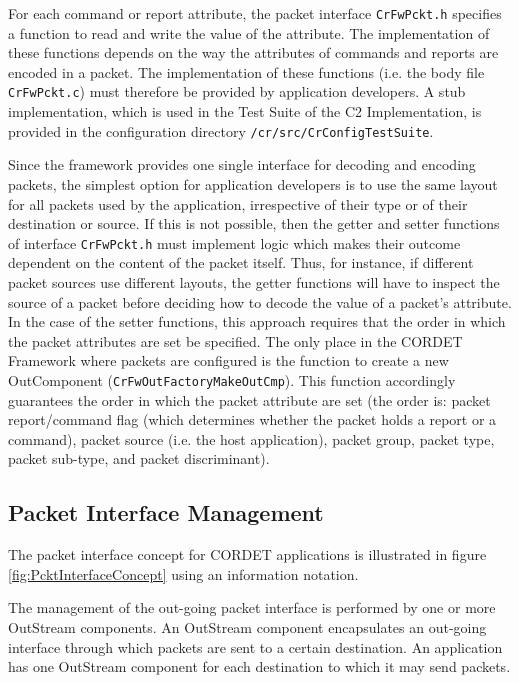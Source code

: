 \documentclass[a4paper,10pt]{article}
\begin{document}
For each command or report attribute, the packet interface \texttt{CrFwPckt.h} specifies a function to read and write the value of the attribute. The implementation of these functions depends on the way the attributes of commands and reports are encoded in a packet. The implementation of these functions (i.e. the body file \texttt{CrFwPckt.c}) must therefore be provided by application developers. A stub implementation, which is used in the Test Suite of the C2 Implementation, is provided in the configuration directory \texttt{/cr/src/CrConfigTestSuite}.

Since the framework provides one single interface for decoding and encoding packets, the simplest option for application developers is to use the same layout for all packets used by the application, irrespective of their type or of their destination or source. If this is not possible, then the getter and setter functions of interface \texttt{CrFwPckt.h} must implement logic which makes their outcome dependent on the content of the packet itself. Thus, for instance, if different packet sources use different layouts, the getter functions will have to inspect the source of a packet before deciding how to decode the value of a packet's attribute. In the case of the setter functions, this approach requires that the order in which the packet attributes are set be specified. The only place in the CORDET Framework where packets are configured is the function to create a new OutComponent (\texttt{CrFwOutFactoryMakeOutCmp}). This function accordingly guarantees the order in which the packet attribute are set (the order is: packet report/command flag (which determines whether the packet holds a report or a command), packet source (i.e. the host application), packet group, packet type, packet sub-type, and packet discriminant).

\subsection{Packet Interface Management}

The packet interface concept for CORDET applications is illustrated in figure \ref{fig:PcktInterfaceConcept} using an information notation.

The management of the out-going packet interface is performed by one or more OutStream components. An OutStream component encapsulates an out-going interface through which packets are sent to a certain destination. An application has one OutStream component for each destination to which it may send packets.
\end{document}
